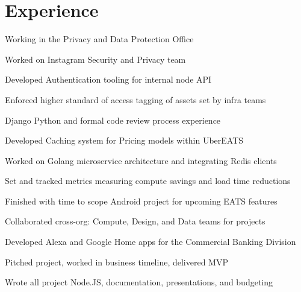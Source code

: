 \documentclass[]{deedy-resume-openfont}
\begin{document}
\begin{minipage}[t]{0.66\textwidth}


\section{Experience}

\vspace{\topsep} %
\begin{tightemize}
\item Working in the Privacy and Data Protection Office
\end{tightemize}
\sectionsep

\begin{tightemize}
\item Worked on Instagram Security and Privacy team
\item Developed Authentication tooling for internal node API
\item Enforced higher standard of access tagging of assets set by infra teams
\item Django Python and formal code review process experience
\end{tightemize}
\sectionsep

\begin{tightemize}
\item Developed Caching system for Pricing models within UberEATS
\item Worked on Golang microservice architecture and integrating Redis clients
\item Set and tracked metrics measuring compute savings and load time reductions
\item Finished with time to scope Android project for upcoming EATS features
\item Collaborated cross-org: Compute, Design, and Data teams for projects
\end{tightemize}
\sectionsep

\begin{tightemize}
\item Developed Alexa and Google Home apps for the Commercial Banking Division
\item Pitched project, worked in business timeline, delivered MVP
\item Wrote all project Node.JS, documentation, presentations, and budgeting
\end{tightemize}
\sectionsep


\end{minipage}
\end{document}
